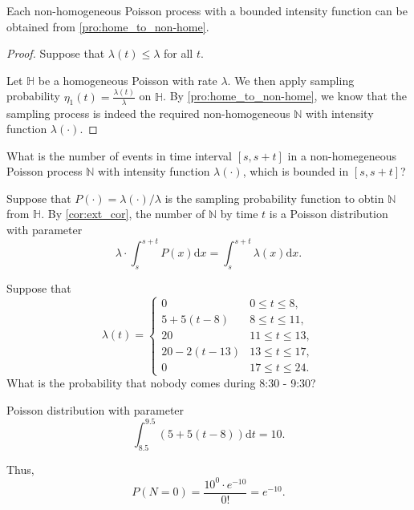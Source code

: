 \begin{proposition}
Each non-homogeneous Poisson process with a bounded intensity function can be obtained from \autoref{pro:home_to_non-home}.
\begin{proof}
Suppose that $ \lambda(t) \le \lambda $ for all $ t $.

Let $ \mathbb{H} $ be a homogeneous Poisson with rate $ \lambda $. We then apply sampling probability $ \eta_{1}(t) = \frac{\lambda(t)}{\lambda} $ on $ \mathbb{H} $. By \autoref{pro:home_to_non-home}, we know that the sampling process is indeed the required non-homogeneous $ \mathbb{N} $ with intensity function $ \lambda(\cdot) $.
\end{proof}
\end{proposition}

\begin{question}
What is the number of events in time interval $ [s, s + t] $ in a non-homegeneous Poisson process $ \mathbb{N} $ with intensity function $ \lambda(\cdot) $, which is bounded in $ [s, s + t] $?

Suppose that $ P(\cdot) = \lambda(\cdot) / \lambda $ is the sampling probability function to obtin $ \mathbb{N} $ from $ \mathbb{H} $. By \autoref{cor:ext_cor}, the number of $ \mathbb{N} $ by time $ t $ is a Poisson distribution with parameter
\[ \lambda \cdot \int_{s}^{s + t} P(x) \mathrm{d}x = \int_{s}^{s + t} \lambda(x) \mathrm{d}x. \]
\end{question}

\begin{example}
Suppose that
\[ \lambda(t) =
  \begin{cases}
    0               & 0 \le t \le 8, \\
    5 + 5(t - 8)    & 8 \le t \le 11, \\
    20              & 11 \le t \le 13, \\
    20 - 2(t - 13)  & 13 \le t \le 17, \\
    0               & 17 \le t \le 24.
  \end{cases} \]
What is the probability that nobody comes during 8:30 - 9:30?

Poisson distribution with parameter
\[ \int_{8.5}^{9.5} (5 + 5(t - 8)) \mathrm{d}t = 10. \]

Thus,
\[ P(N = 0) = \frac{10^{0} \cdot e^{-10}}{0!} = e^{-10}. \]
\end{example}

